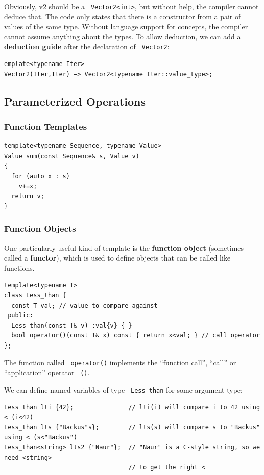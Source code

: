 \documentclass[11pt]{article}
\let\OldTexttt\texttt
\renewcommand{\texttt}[1]{\OldTexttt{\color{MidnightBlue} #1}}
\begin{document}
Obviously, v2 should be a \texttt{Vector2<int>}, but without help, the compiler cannot deduce that. The
code only states that there is a constructor from a pair of values of the same type. Without
language support for concepts, the compiler cannot assume anything about the types. To allow
deduction, we can add a \textbf{deduction guide} after the declaration of \texttt{Vector2}:
\begin{verbatim}
emplate<typename Iter>
Vector2(Iter,Iter) −> Vector2<typename Iter::value_type>;
\end{verbatim}
\subsection{Parameterized Operations}
\label{sec:org4b50d4b}
\subsubsection{Function Templates}
\label{sec:org8287d19}
\begin{verbatim}
template<typename Sequence, typename Value>
Value sum(const Sequence& s, Value v)
{
  for (auto x : s)
    v+=x;
  return v;
}
\end{verbatim}
\subsubsection{Function Objects}
\label{sec:orgdc2c632}
One particularly useful kind of template is the \textbf{function object} (sometimes called a \textbf{functor}),
which is used to define objects that can be called like functions.
\begin{verbatim}
template<typename T>
class Less_than {
  const T val; // value to compare against
 public:
  Less_than(const T& v) :val{v} { }
  bool operator()(const T& x) const { return x<val; } // call operator
};
\end{verbatim}
The function called \texttt{operator()} implements the ``function call'', ``call'' or ``application'' operator
\texttt{()}.

We can define named variables of type \texttt{Less\_than} for some argument type:
\begin{verbatim}
Less_than lti {42};               // lti(i) will compare i to 42 using < (i<42)
Less_than lts {"Backus"s};        // lts(s) will compare s to "Backus" using < (s<"Backus")
Less_than<string> lts2 {"Naur"};  // "Naur" is a C-style string, so we need <string>
                                  // to get the right <
\end{verbatim}
\end{document}
